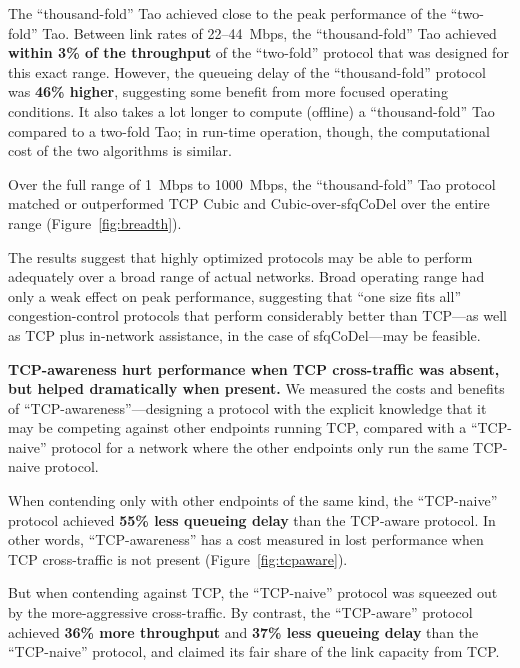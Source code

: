 The ``thousand-fold'' Tao achieved close to the peak performance of
the ``two-fold'' Tao. Between link rates of 22--44~Mbps, the
``thousand-fold'' Tao achieved \textbf{within 3\% of the throughput}
of the ``two-fold'' protocol that was designed for this exact
range. However, the queueing delay of the ``thousand-fold'' protocol
was \textbf{46\% higher}, suggesting some benefit from more focused
operating conditions. It also takes a lot longer to compute (offline)
a ``thousand-fold'' Tao compared to a two-fold Tao; in run-time
operation, though, the computational cost of the two algorithms is
similar.

Over the full range of 1~Mbps to 1000~Mbps, the ``thousand-fold'' Tao
protocol matched or outperformed TCP Cubic and Cubic-over-sfqCoDel
over the entire range (Figure~\ref{fig:breadth}).

The results suggest that highly optimized protocols may be able to
perform adequately over a broad range of actual networks. Broad
operating range had only a weak effect on peak performance, suggesting
that ``one size fits all'' congestion-control protocols that perform
considerably better than TCP---as well as TCP plus in-network
assistance, in the case of sfqCoDel---may be feasible.


\vspace{\baselineskip}

\noindent \textbf{TCP-awareness hurt performance when TCP
  cross-traffic was absent, but helped dramatically when present.} We
measured the costs and benefits of ``TCP-awareness''---designing a
protocol with the explicit knowledge that it may be competing against
other endpoints running TCP, compared with a ``TCP-naive'' protocol
for a network where the other endpoints only run the same TCP-naive
protocol.

When contending only with other endpoints of the same kind, the
``TCP-naive'' protocol achieved \textbf{55\% less queueing delay} than
the TCP-aware protocol. In other words, ``TCP-awareness'' has a cost
measured in lost performance when TCP cross-traffic is not present
(Figure~\ref{fig:tcpaware}).

But when contending against TCP, the ``TCP-naive'' protocol was
squeezed out by the more-aggressive cross-traffic. By contrast, the
``TCP-aware'' protocol achieved \textbf{36\% more throughput} and
\textbf{37\% less queueing delay} than the ``TCP-naive'' protocol, and
claimed its fair share of the link capacity from TCP.
